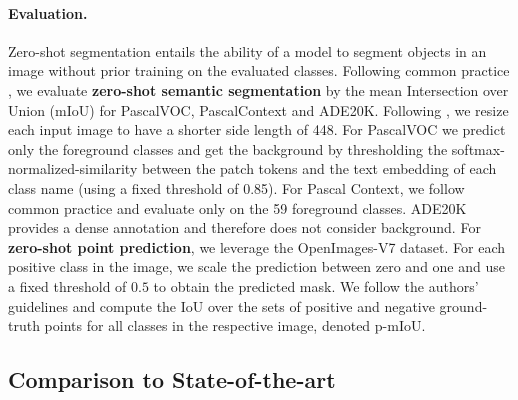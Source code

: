 \documentclass[10pt,twocolumn,letterpaper]{article}
\begin{document}
\paragraph{Evaluation.}
Zero-shot segmentation entails the ability of a model to segment objects in an image without prior training on the evaluated classes.
Following common practice \citep{xu2022groupvit, luo2023segclip, xu2023learning}, we evaluate \textbf{zero-shot semantic segmentation} by the mean Intersection over Union (mIoU) for PascalVOC, PascalContext and ADE20K.
Following \citep{xu2022groupvit}, we resize each input image to have a shorter side length of 448.
For PascalVOC we predict only the foreground classes and get the background by thresholding the softmax-normalized-similarity between the patch tokens and the text embedding of each class name (using a fixed threshold of 0.85).
For Pascal Context, we follow common practice and evaluate only on the 59 foreground classes.
ADE20K provides a dense annotation and therefore does not consider background. 
For \textbf{zero-shot point prediction}, we leverage the OpenImages-V7 dataset. For each positive class in the image, we scale the prediction between zero and one 
and use a fixed threshold of $0.5$ to obtain the predicted mask. We follow the authors' guidelines \citep{benenson2022colouring} and compute the IoU over the sets of positive and negative ground-truth points for all classes in the respective image, denoted p-mIoU. 

\subsection{Comparison to State-of-the-art}
\end{document}
